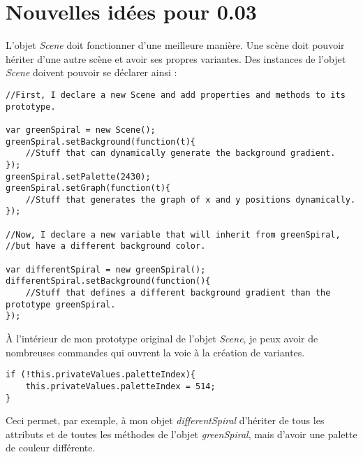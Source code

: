\section{Nouvelles idées pour 0.03}
L'objet \textit{Scene} doit fonctionner d'une meilleure manière. Une scène doit pouvoir hériter d'une autre scène et avoir ses propres variantes. Des instances de l'objet \textit{Scene} doivent pouvoir se déclarer ainsi :

\begin{lstlisting}
//First, I declare a new Scene and add properties and methods to its prototype.

var greenSpiral = new Scene();
greenSpiral.setBackground(function(t){
    //Stuff that can dynamically generate the background gradient.
});
greenSpiral.setPalette(2430);
greenSpiral.setGraph(function(t){
    //Stuff that generates the graph of x and y positions dynamically.
});

//Now, I declare a new variable that will inherit from greenSpiral, 
//but have a different background color.

var differentSpiral = new greenSpiral();
differentSpiral.setBackground(function(){
    //Stuff that defines a different background gradient than the prototype greenSpiral.
});
\end{lstlisting}

À l'intérieur de mon prototype original de l'objet \textit{Scene}, je peux avoir de nombreuses commandes qui ouvrent la voie à la création de variantes.

\begin{lstlisting}
if (!this.privateValues.paletteIndex){
    this.privateValues.paletteIndex = 514;
}
\end{lstlisting}

Ceci permet, par exemple, à mon objet \textit{differentSpiral} d'hériter de tous les attributs et de toutes les méthodes de l'objet \textit{greenSpiral}, mais d'avoir une palette de couleur différente.


